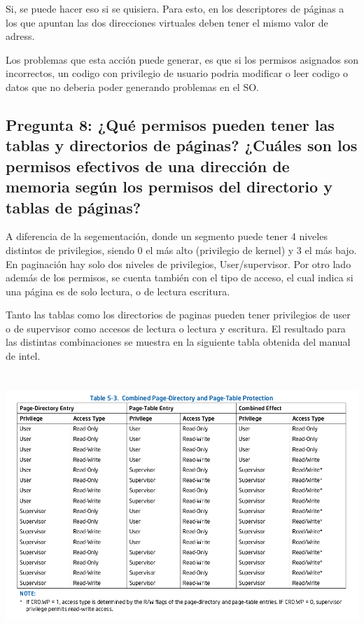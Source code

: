 \documentclass[a4paper,10pt,twoside]{article}
\begin{document}
Si, se puede hacer eso si se quisiera. Para esto, en los descriptores de páginas a los que apuntan las dos direcciones virtuales deben tener el mismo valor de adress.

Los problemas que esta acción puede generar, es que si los permisos asignados son incorrectos, un codigo con privilegio de usuario podria modificar o leer codigo o datos que no deberia poder generando problemas en el SO.


\subsection{Pregunta 8: ¿Qué permisos pueden tener las tablas y directorios de páginas? ¿Cuáles
son los permisos efectivos de una dirección de memoria según los permisos del directorio
y tablas de páginas?}

A diferencia de la segementación, donde un segmento puede tener 4 niveles distintos de privilegios, siendo 0 el más alto (privilegio de kernel) y 3 el más bajo. En paginación hay solo dos niveles de privilegios, User/supervisor. Por otro lado además de los permisos, se cuenta también con el tipo de acceso, el cual indica si una página es de solo lectura, o de lectura escritura.

Tanto las tablas como los directorios de paginas pueden tener privilegios de user o de supervisor como accesos de lectura o lectura y escritura. El resultado para las distintas combinaciones se muestra en la siguiente tabla obtenida del manual de intel.

\includegraphics[height=10cm]{privilegios.png} 
\end{document}
